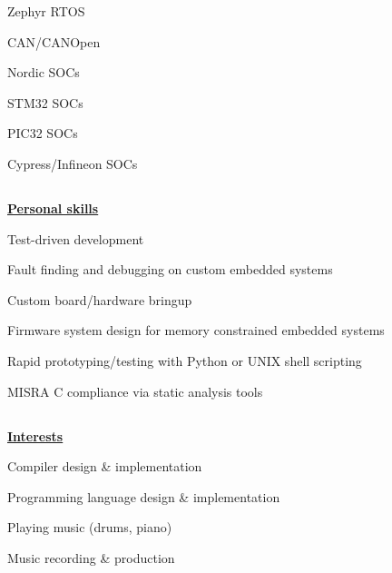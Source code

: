 \documentclass[6pt]{article}
\begin{document}
\begin{minipage}{13em}
{Zephyr RTOS

CAN/CANOpen

Nordic SOCs

STM32 SOCs

PIC32 SOCs

Cypress/Infineon SOCs}

\subsection*{}
{\underline{\textbf{Personal skills}}}

\noindent
\begin{flushleft}
\begin{itemize}
{\small
    \item Test-driven development
    \item Fault finding and debugging on custom embedded systems
    \item Custom board/hardware bringup
    \item Firmware system design for memory constrained embedded systems
    \item Rapid prototyping/testing with Python or UNIX shell scripting
    \item MISRA C compliance via static analysis tools
}
\end{itemize}
\end{flushleft}

\subsection*{}
{\underline{\textbf{Interests}}}

\noindent
\begin{flushleft}
\begin{itemize}
{\small
    \item Compiler design \& implementation
    \item Programming language design \& implementation
    \item Playing music (drums, piano)
    \item Music recording \& production
}
\end{itemize}
\end{flushleft}
\end{minipage}
\hspace*{2em}
%
\end{document}
